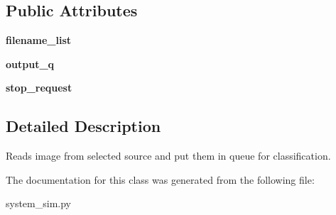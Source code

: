 \subsection*{Public Attributes}
\begin{DoxyCompactItemize}
\item 
\mbox{\label{classsystem__sim_1_1image__producer_aafc661c06504288d0feab78515766bff}} 
{\bfseries filename\+\_\+list}
\item 
\mbox{\label{classsystem__sim_1_1image__producer_ac8d2a34dc50113063bc9154ab5cdb2d5}} 
{\bfseries output\+\_\+q}
\item 
\mbox{\label{classsystem__sim_1_1image__producer_aa87d2ee4e59aa54ce7060d1b132724f7}} 
{\bfseries stop\+\_\+request}
\end{DoxyCompactItemize}


\subsection{Detailed Description}
Reads image from selected source and put them in queue for classification. 



The documentation for this class was generated from the following file\+:\begin{DoxyCompactItemize}
\item 
system\+\_\+sim.\+py\end{DoxyCompactItemize}
